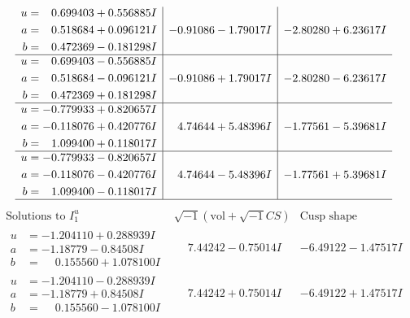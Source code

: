 \documentclass[1p]{elsarticle_modified}
\theoremstyle{definition}
\newcommand{\I}{\sqrt{-1}}
\begin{document}
$$\begin{array}{c|c|c}
\begin{aligned}
u &= \phantom{-}0.699403 + 0.556885 I \\
a &= \phantom{-}0.518684 + 0.096121 I \\
b &= \phantom{-}0.472369 - 0.181298 I\end{aligned}
 & -0.91086 - 1.79017 I & -2.80280 + 6.23617 I \\ \hline\begin{aligned}
u &= \phantom{-}0.699403 - 0.556885 I \\
a &= \phantom{-}0.518684 - 0.096121 I \\
b &= \phantom{-}0.472369 + 0.181298 I\end{aligned}
 & -0.91086 + 1.79017 I & -2.80280 - 6.23617 I \\ \hline\begin{aligned}
u &= -0.779933 + 0.820657 I \\
a &= -0.118076 + 0.420776 I \\
b &= \phantom{-}1.099400 + 0.118017 I\end{aligned}
 & \phantom{-}4.74644 + 5.48396 I & -1.77561 - 5.39681 I \\ \hline\begin{aligned}
u &= -0.779933 - 0.820657 I \\
a &= -0.118076 - 0.420776 I \\
b &= \phantom{-}1.099400 - 0.118017 I\end{aligned}
 & \phantom{-}4.74644 - 5.48396 I & -1.77561 + 5.39681 I\\
 \hline 
 \end{array}$$\newpage$$\begin{array}{c|c|c}  
\text{Solutions to }I^u_{1}& \I (\text{vol} + \sqrt{-1}CS) & \text{Cusp shape}\\
 \hline 
\begin{aligned}
u &= -1.204110 + 0.288939 I \\
a &= -1.18779 - 0.84508 I \\
b &= \phantom{-}0.155560 + 1.078100 I\end{aligned}
 & \phantom{-}7.44242 - 0.75014 I & -6.49122 - 1.47517 I \\ \hline\begin{aligned}
u &= -1.204110 - 0.288939 I \\
a &= -1.18779 + 0.84508 I \\
b &= \phantom{-}0.155560 - 1.078100 I\end{aligned}
 & \phantom{-}7.44242 + 0.75014 I & -6.49122 + 1.47517 I \\ \hline\begin{aligned}

\end{aligned}
\end{array}$$
\end{document}

